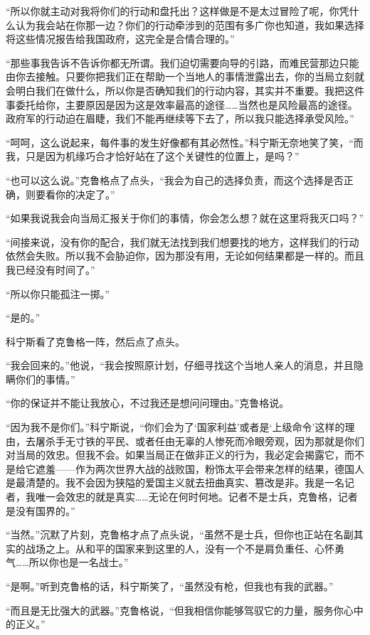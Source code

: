 “所以你就主动对我将你们的行动和盘托出？这样做是不是太过冒险了呢，你凭什么认为我会站在你那一边？你们的行动牵涉到的范围有多广你也知道，我如果选择将这些情况报告给我国政府，这完全是合情合理的。”

“那些事我告诉不告诉你都无所谓。我们迫切需要向导的引路，而难民营那边只能由你去接触。只要你把我们正在帮助一个当地人的事情泄露出去，你的当局立刻就会明白我们在做什么，所以你是否确知我们的行动内容，其实并不重要。我把这件事委托给你，主要原因是因为这是效率最高的途径……当然也是风险最高的途径。政府军的行动迫在眉睫，我们不能再继续等下去了，所以我只能选择承受风险。”

“呵呵，这么说起来，每件事的发生好像都有其必然性。”科宁斯无奈地笑了笑，“而我，只是因为机缘巧合才恰好站在了这个关键性的位置上，是吗？”

“也可以这么说。”克鲁格点了点头，“我会为自己的选择负责，而这个选择是否正确，则要看你的决定了。”

“如果我说我会向当局汇报关于你们的事情，你会怎么想？就在这里将我灭口吗？”

“间接来说，没有你的配合，我们就无法找到我们想要找的地方，这样我们的行动依然会失败。所以我不会胁迫你，因为那没有用，无论如何结果都是一样的。而且我已经没有时间了。”

“所以你只能孤注一掷。”

“是的。”

科宁斯看了克鲁格一阵，然后点了点头。

“我会回来的。”他说，“我会按照原计划，仔细寻找这个当地人亲人的消息，并且隐瞒你们的事情。”

“你的保证并不能让我放心，不过我还是想问问理由。”克鲁格说。

“因为我不是你们。”科宁斯说，“你们会为了‘国家利益’或者是‘上级命令’这样的理由，去屠杀手无寸铁的平民、或者任由无辜的人惨死而冷眼旁观，因为那就是你们对当局的效忠。但我不会。如果当局正在做非正义的行为，我必定会揭露它，而不是给它遮羞——作为两次世界大战的战败国，粉饰太平会带来怎样的结果，德国人是最清楚的。我不会因为狭隘的爱国主义就去扭曲真实、篡改是非。我是一名记者，我唯一会效忠的就是真实……无论在何时何地。记者不是士兵，克鲁格，记者是没有国界的。”

“当然。”沉默了片刻，克鲁格才点了点头说，“虽然不是士兵，但你也正站在名副其实的战场之上。从和平的国家来到这里的人，没有一个不是肩负重任、心怀勇气……所以你也是一名战士。”

“是啊。”听到克鲁格的话，科宁斯笑了，“虽然没有枪，但我也有我的武器。”

“而且是无比强大的武器。”克鲁格说，“但我相信你能够驾驭它的力量，服务你心中的正义。”

